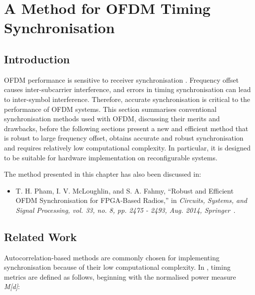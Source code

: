 \chapter{A Method for OFDM Timing Synchronisation}
\label{chap:Synchronisation}

\section{Introduction}
OFDM performance is sensitive to receiver synchronisation \cite{Hanzo2006}. 
Frequency offset causes inter-subcarrier interference, and errors in timing synchronisation can lead to inter-symbol interference. 
Therefore, accurate synchronisation is critical to the performance of OFDM systems.  
This section summarises conventional synchronisation methods used with OFDM, discussing their merits and drawbacks, before the following sections present a new and efficient method that is robust to large frequency offset, obtains accurate  and robust synchronisation and requires relatively low computational complexity. In particular, it is designed to be suitable for hardware implementation on reconfigurable systems. 

The method presented in this chapter has also been discussed in:
\begin{itemize}
\item T. H. Pham, I. V. McLoughlin, and S. A. Fahmy, ``Robust and Efficient OFDM Synchronisation for FPGA-Based Radios,'' in \textit{Circuits, Systems, and Signal Processing, vol. 33, no. 8, pp. 2475 - 2493, Aug. 2014, Springer}~\cite{Pham2014}.
\end{itemize}

\section{Related Work}
Autocorrelation-based methods are commonly chosen for implementing synchronisation because of their low computational complexity. In \cite{Schmidl1997}, timing metrics are defined as follows, beginning with the normalised power measure \emph{M[d]}:

